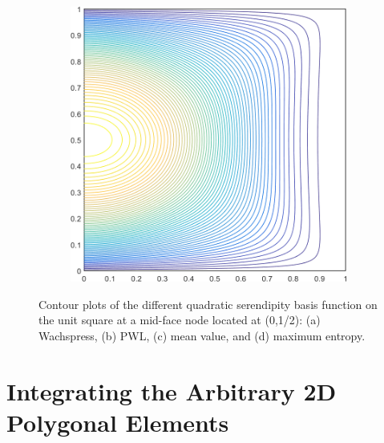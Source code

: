 \begin{figure}
\begin{subfigure}[b]{0.39\textwidth}
		\caption{}
	\end{subfigure}
	\hspace{1.5cm}
	\begin{subfigure}[b]{0.39\textwidth}
		\centering
		\includegraphics[width=\textwidth]{figures/sec_BF/square_MAXENT2_contour_b8.png}
		\caption{}
	\end{subfigure}
\caption[Contour plots of the quadratic basis functions on the unit square.]{Contour plots of the different quadratic serendipity basis function on the unit square at a mid-face node located at (0,1/2): (a) Wachspress, (b) PWL, (c) mean value, and (d) maximum entropy.}
\end{figure}

\section{Integrating the Arbitrary 2D Polygonal Elements}
\label{sec::BF_2DIntegration}

